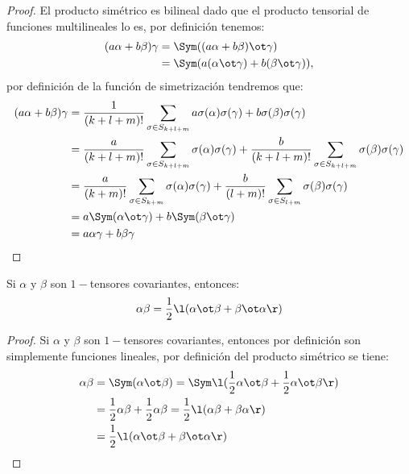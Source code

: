 \begin{proof}
	El producto simétrico es bilineal dado que el producto tensorial de funciones
	multilineales lo es, por definición tenemos:
	\begin{align*}
		(a\alpha + b\beta) \gamma
		 & = \Sym ((a \alpha + b \beta)\ot \gamma)              \\
		 & = \Sym (a(\alpha \ot \gamma) + b(\beta \ot \gamma)),
	\end{align*}
	por definición de la función de simetrización tendremos que:
	\begin{align*}
		(a \alpha + b \beta)\gamma
		 & = \frac{1}{(k+l+m)!} \sum_{\sigma \in S_{k+l+m}}
		a \sigma(\alpha) \sigma(\gamma) + b \sigma(\beta) \sigma(\gamma) \\
		 & = \frac{a}{(k+l+m)!} \sum_{\sigma \in S_{k+l+m}}
		\sigma(\alpha) \sigma(\gamma)
		+ \frac{b}{(k+l+m)!} \sum_{\sigma \in S_{k+l+m}}
		\sigma(\beta) \sigma(\gamma)                                     \\
		 & = \frac{a}{(k+m)!} \sum_{\sigma \in S_{k+m}}
		\sigma(\alpha) \sigma(\gamma)
		+ \frac{b}{(l+m)!} \sum_{\sigma \in S_{l+m}}
		\sigma(\beta) \sigma(\gamma)                                     \\
		 & = a\Sym(\alpha \ot \gamma) + b\Sym(\beta \ot \gamma)          \\
		 & = a \alpha \gamma + b \beta \gamma
	\end{align*}
\end{proof}

\begin{lemma}\label{Lema: Descomposición de Tensores}
	Si $\alpha$ y $\beta$ son $1-$tensores covariantes, entonces:
	\[
		\alpha \beta = \frac{1}{2} \l(\alpha \ot \beta + \beta \ot \alpha \r)
	\]
\end{lemma}

\begin{proof}
	Si $\alpha$ y $\beta$ son $1-$tensores covariantes, entonces por definición
	son simplemente funciones lineales, por definición del producto simétrico se
	tiene:
	\begin{align*}
		\alpha \beta
		 & = \Sym(\alpha \ot \beta)
		= \Sym \l(\frac{1}{2} \alpha \ot \beta + \frac{1}{2} \alpha \ot \beta \r) \\
		 & = \frac{1}{2} \alpha \beta + \frac{1}{2} \alpha \beta
		= \frac{1}{2} \l( \alpha \beta + \beta \alpha \r)                         \\
		 & = \frac{1}{2} \l( \alpha \ot \beta + \beta \ot \alpha \r)
	\end{align*}
\end{proof}
